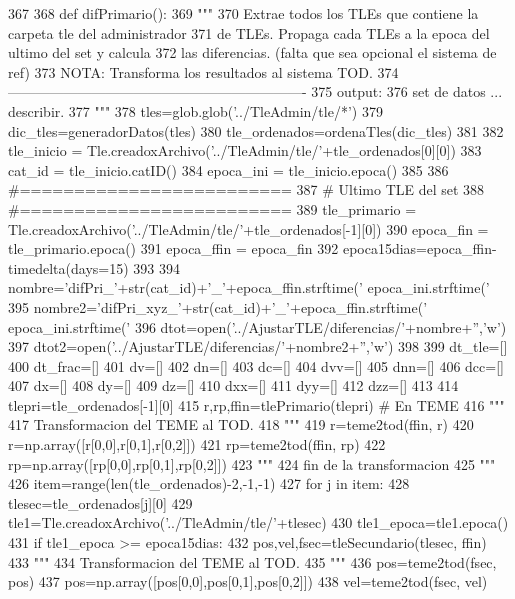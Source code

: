 \begin{DoxyCode}
367 
368 def difPrimario():
369     """
370     Extrae todos los TLEs que contiene la carpeta tle del administrador
371     de TLEs. Propaga cada TLEs a la epoca del ultimo del set y calcula 
372     las diferencias. (falta que sea opcional el sistema de ref)
373     NOTA: Transforma los resultados al sistema TOD.
374     ----------------------------------------------------------------
375     output:
376         set de datos ... describir. 
377     """
378     tles=glob.glob('../TleAdmin/tle/*')
379     dic_tles=generadorDatos(tles)
380     tle_ordenados=ordenaTles(dic_tles)
381     
382     tle_inicio = Tle.creadoxArchivo('../TleAdmin/tle/'+tle_ordenados[0][0])
383     cat_id = tle_inicio.catID()
384     epoca_ini = tle_inicio.epoca()
385     
386     #=========================
387     # Ultimo TLE del set
388     #=========================
389     tle_primario = Tle.creadoxArchivo('../TleAdmin/tle/'+tle_ordenados[-1][0])
390     epoca_fin  = tle_primario.epoca()
391     epoca_ffin = epoca_fin
392     epoca15dias=epoca_ffin-timedelta(days=15)
393     
394     nombre='difPri_'+str(cat_id)+'_'+epoca_ffin.strftime('%
      epoca_ini.strftime('%
395     nombre2='difPri_xyz_'+str(cat_id)+'_'+epoca_ffin.strftime('%
      epoca_ini.strftime('%
396     dtot=open('../AjustarTLE/diferencias/'+nombre+'','w')
397     dtot2=open('../AjustarTLE/diferencias/'+nombre2+'','w')
398     
399     dt_tle=[]
400     dt_frac=[]
401     dv=[]
402     dn=[]
403     dc=[]
404     dvv=[]
405     dnn=[]
406     dcc=[]
407     dx=[]
408     dy=[]
409     dz=[]
410     dxx=[]
411     dyy=[]
412     dzz=[]
413 
414     tlepri=tle_ordenados[-1][0]
415     r,rp,ffin=tlePrimario(tlepri) # En TEME
416     """
417     Transformacion del TEME al TOD.
418     """ 
419     r=teme2tod(ffin, r)
420     r=np.array([r[0,0],r[0,1],r[0,2]])
421     rp=teme2tod(ffin, rp) 
422     rp=np.array([rp[0,0],rp[0,1],rp[0,2]])
423     """
424     fin de la transformacion
425     """
426     item=range(len(tle_ordenados)-2,-1,-1)       
427     for j in item:
428         tlesec=tle_ordenados[j][0]
429         tle1=Tle.creadoxArchivo('../TleAdmin/tle/'+tlesec)
430         tle1_epoca=tle1.epoca()
431         if tle1_epoca >= epoca15dias:
432             pos,vel,fsec=tleSecundario(tlesec, ffin)
433             """
434             Transformacion del TEME al TOD.
435             """ 
436             pos=teme2tod(fsec, pos)
437             pos=np.array([pos[0,0],pos[0,1],pos[0,2]])
438             vel=teme2tod(fsec, vel)

\end{DoxyCode}
